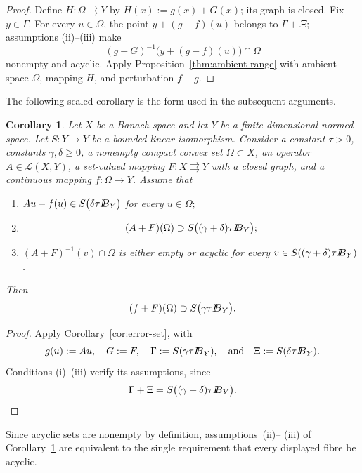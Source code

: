 \documentclass[11pt]{amsart}
\newtheorem{corollary}[theorem]{Corollary}
\theoremstyle{definition}
\theoremstyle{remark}
\newcommand{\tto}{\rightrightarrows}
\newcommand{\Lin}{\mathcal L}
\def\ball{{I\kern -.35em B}}
\begin{document}
	\begin{proof}
		Define $H:\Omega\tto Y$ by $H(x):=g(x)+G(x)$; its graph is closed.
		Fix $y\in\Gamma$.  For every
		$u\in\Omega$, the point $y+(g-f)(u)$ belongs to $\Gamma+\Xi$; assumptions
		{\rm (ii)}--{\rm (iii)} make
		$$
		(g+G)^{-1}\bigl(y+(g-f)(u)\bigr)\cap\Omega
		$$
		nonempty and acyclic.  Apply Proposition~\ref{thm:ambient-range} with
		ambient space $\Omega$, mapping $H$, and perturbation $f-g$.
	\end{proof}
	
	The following scaled corollary is the form used in the subsequent
	arguments.
	
	\begin{corollary}
		\label{thm:scaled-transfer}
		Let $X$ be a Banach space and let $Y$ be a finite-dimensional normed
		space.  Let $S:Y\longrightarrow Y$ be a bounded linear
		isomorphism.  Consider a
		constant $\tau>0$, constants $\gamma,\delta\ge0$, a nonempty compact convex set
		$\Omega\subset X$, an operator $A\in\Lin(X,Y)$, a set-valued mapping
		$F:X\tto Y$ with a closed graph, and a continuous mapping
		$f:\Omega\longrightarrow Y$.  Assume that
		\begin{enumerate}
			
			\item[\rm (i)]
			$Au-f(u)\in S\bigl(\delta\tau\ball_Y\bigr)$ for every $u\in\Omega;$
			\item[\rm (ii)]
			$$
			(A+F)(\Omega)\supset
			S\bigl((\gamma+\delta)\tau\ball_Y\bigr);
			$$
			\item[\rm (iii)]
			$(A+F)^{-1}(v)\cap\Omega$
			is either empty or acyclic for every
			$v\in S((\gamma+\delta)\tau\ball_Y)$.
		\end{enumerate}
		Then
		$$
		(f+F)(\Omega)
		\supset S\bigl(\gamma\tau\ball_Y\bigr).
		$$
	\end{corollary}
	\begin{proof}
		Apply Corollary~\ref{cor:error-set}, with
		$$
		g(u):=Au,\quad G:=F,\quad
		\Gamma:=S(\gamma\tau\ball_Y),\quad\text{and}\quad
		\Xi:=S(\delta\tau\ball_Y).
		$$
		Conditions {\rm (i)}--{\rm (iii)} verify its assumptions, since
		$$
		\Gamma+\Xi=S\bigl((\gamma+\delta)\tau\ball_Y\bigr).
		$$
	\end{proof}
	
	Since acyclic sets are nonempty by definition, assumptions~{\rm (ii)}--
	{\rm (iii)} of Corollary~\ref{thm:scaled-transfer} are equivalent to the
	single requirement that every displayed fibre be acyclic.
	
\end{document}

